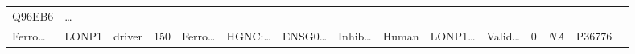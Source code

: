 \documentclass[
]{article}
\begin{document}
\begin{longtable}[]{@{}lllllllllllllll@{}}
\begin{minipage}[t]{0.05\columnwidth}
Q96EB6\strut
\end{minipage} & \begin{minipage}[t]{0.02\columnwidth}\raggedright
\ldots{}\strut
\end{minipage}\tabularnewline
\begin{minipage}[t]{0.05\columnwidth}\raggedright
Ferro\ldots{}\strut
\end{minipage} & \begin{minipage}[t]{0.05\columnwidth}\raggedright
LONP1\strut
\end{minipage} & \begin{minipage}[t]{0.04\columnwidth}\raggedright
driver\strut
\end{minipage} & \begin{minipage}[t]{0.02\columnwidth}\raggedright
150\strut
\end{minipage} & \begin{minipage}[t]{0.05\columnwidth}\raggedright
Ferro\ldots{}\strut
\end{minipage} & \begin{minipage}[t]{0.05\columnwidth}\raggedright
HGNC:\ldots{}\strut
\end{minipage} & \begin{minipage}[t]{0.05\columnwidth}\raggedright
ENSG0\ldots{}\strut
\end{minipage} & \begin{minipage}[t]{0.05\columnwidth}\raggedright
Inhib\ldots{}\strut
\end{minipage} & \begin{minipage}[t]{0.05\columnwidth}\raggedright
Human\strut
\end{minipage} & \begin{minipage}[t]{0.05\columnwidth}\raggedright
LONP1\ldots{}\strut
\end{minipage} & \begin{minipage}[t]{0.05\columnwidth}\raggedright
Valid\ldots{}\strut
\end{minipage} & \begin{minipage}[t]{0.05\columnwidth}\raggedright
0\strut
\end{minipage} & \begin{minipage}[t]{0.05\columnwidth}\raggedright
\emph{NA}\strut
\end{minipage} & \begin{minipage}[t]{0.05\columnwidth}\raggedright
P36776\strut
\end{minipage} & \begin{minipage}[t]{0.02\columnwidth}\raggedright

\end{minipage}
\end{longtable}
\end{document}
